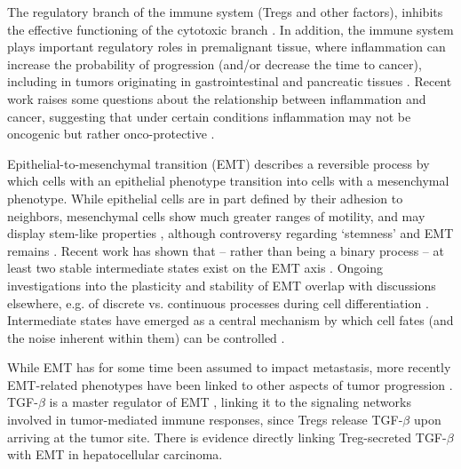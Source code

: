 \documentclass[11pt]{article}
\begin{document}
The regulatory branch of the immune system (Tregs and other factors), inhibits the effective functioning of the cytotoxic branch \cite{ruffell2010lymphocytes}.
In addition, the immune system plays important regulatory roles in premalignant tissue, where inflammation can increase the probability of progression (and/or decrease the time to cancer), including in tumors originating in gastrointestinal and pancreatic tissues \cite{hu10_inflammationinduced, balkwill01_inflammation}.
Recent work raises some questions about the relationship between inflammation and cancer, suggesting that under certain conditions inflammation may not be oncogenic but rather onco-protective \cite{guo17_multiscale}.
\par
Epithelial-to-mesenchymal transition (EMT) describes a reversible process by which cells with an epithelial phenotype transition into cells with a mesenchymal phenotype.
While epithelial cells are in part defined by their adhesion to neighbors, mesenchymal cells show much greater ranges of motility, and may display stem-like properties \cite{nieto2016emt}, although controversy regarding `stemness' and EMT remains \cite{nie18_stem, sha19_intermediate}.  
Recent work has shown that -- rather than being a binary process -- at least two stable intermediate states exist on the EMT axis \cite{hong2015ovol2, jolly15_coupling}.
Ongoing investigations into the plasticity and stability of EMT overlap with discussions elsewhere, e.g. of discrete vs. continuous processes during cell differentiation \cite{moris16_transition}.
Intermediate states have emerged as a central mechanism by which cell fates (and the noise inherent within them) can be controlled \cite{maclean18_exploring, ta16_controlling, rackauckas18_meanindependent}. 
\par 
While EMT has for some time been assumed to impact metastasis, more recently EMT-related phenotypes have been linked to other aspects of tumor progression \cite{nieto2016emt,peinado2007snail}.
TGF-$\beta$ is a master regulator of EMT \cite{lim2012epithelial}, linking it to the signaling networks involved in tumor-mediated immune responses, since Tregs release TGF-$\beta$ upon arriving at the tumor site\cite{terry2017new}. 
There is evidence directly linking Treg-secreted TGF-$\beta$ with EMT in hepatocellular carcinoma\cite{shi2019cd4+}.
\end{document}
